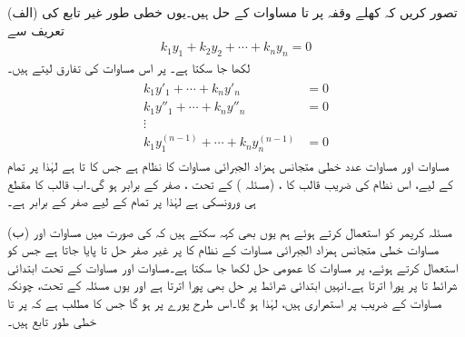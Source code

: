 
(الف) \quad تصور کریں کہ کھلے وقفہ  پر   تا  مساوات  کے حل ہیں۔یوں خطی طور غیر تابع کی تعریف سے 
\begin{align}\label{مساوات_سادہ_بلند_ورونسکی_ب}
k_1y_1+k_2y_2+\cdots+k_ny_n=0
\end{align}
لکھا جا سکتا ہے۔  پر اس مساوات کی  تفارق لیتے ہیں۔
\begin{gather}
\begin{aligned}\label{مساوات_سادہ_بلند_ورونسکی_پ}
k_1y'_1+\cdots+k_ny'_n&=0\\
k_1y''_1+\cdots+k_ny''_n&=0\\
\vdots &\\
k_1y^{(n-1)}_1+\cdots+k_ny^{(n-1)}_n&=0
\end{aligned}
\end{gather}
مساوات  اور مساوات   عدد خطی متجانس ہمزاد  الجبرائی مساوات کا نظام ہے جس کا   تا  ہے لہٰذا  پر تمام  کے لیے، اس نظام کی  ضریب  قالب کا ،  (مسئلہ ) کے تحت ،  صفر کے برابر ہو گی۔اب قالب کا مقطع ہی ورونسکی ہے لہٰذا  پر تمام  کے لیے  صفر کے برابر ہے۔

(ب) \quad مسئلہ کریمر کو استعمال کرتے ہوئے ہم یوں بھی کہہ سکتے ہیں کہ  کی صورت میں مساوات  اور مساوات  خطی متجانس ہمزاد  الجبرائی مساوات کے نظام کا  پر غیر صفر حل  تا  پایا جاتا ہے جس کو استعمال کرتے ہوئے،  پر مساوات  کا عمومی حل لکھا جا سکتا ہے۔مساوات  اور مساوات   کے تحت   ابتدائی شرائط  تا  پر پورا اترتا ہے۔انہیں ابتدائی شرائط پر حل  بھی پورا اترتا ہے اور یوں مسئلہ  کے تحت، چونکہ  مساوات  کے  ضریب   پر استمراری ہیں، لہٰذا  ہو گا۔اس طرح  پورے  پر ہو گا جس کا مطلب ہے کہ   پر  تا  خطی طور تابع ہیں۔

